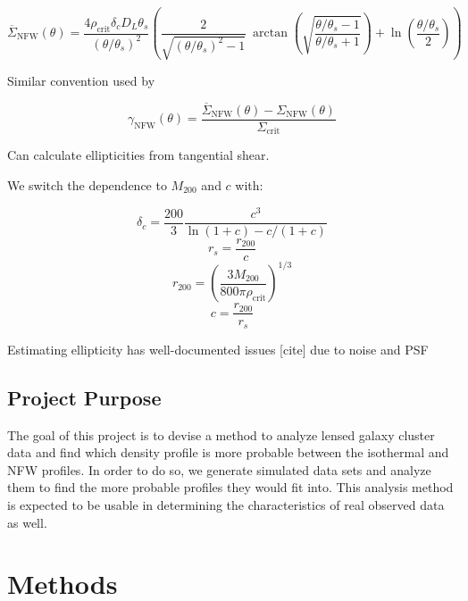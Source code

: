 \documentclass[10pt]{article}
\begin{document}
\begin{equation}
\overline{\Sigma}_\mathrm{NFW}(\theta) = \frac{4 \rho_\mathrm{crit} \delta_c D_L \theta_s}{(\theta/\theta_s)^2} \left(
    \frac{2}{\sqrt{(\theta/\theta_s)^2 - 1}} ~\arctan\left(\sqrt{\frac{\theta/\theta_s - 1}{\theta/\theta_s + 1}} \right) + \ln{\left(\frac{\theta/\theta_s}{2}\right)}
\right)
\end{equation}

Similar convention used by \citet{Bartelmann2001}

\begin{equation}
\gamma_\mathrm{NFW}(\theta) = \frac{\overline{\Sigma}_\mathrm{NFW}(\theta) - \Sigma_\mathrm{NFW}(\theta)}{\Sigma_\mathrm{crit}}
\end{equation}

Can calculate ellipticities from tangential shear.

We switch the dependence to $M_{200}$ and $c$ with:

\begin{equation}
\delta_c = \frac{200}{3} \frac{c^3}{\ln(1 + c) - c/(1 + c)}
\end{equation}
\begin{equation}
r_s = \frac{r_{200}}{c}
\end{equation}
\begin{equation}
r_{200} = \left( \frac{3 M_{200}}{800 \pi \rho_\mathrm{crit}} \right)^{1/3}
\end{equation}
\begin{equation}
c = \frac{r_{200}}{r_s}
\end{equation}

Estimating ellipticity has well-documented issues [cite] due to noise and PSF

\subsection{Project Purpose}
The goal of this project is to devise a method to analyze lensed galaxy cluster data and find which density profile is more probable between the isothermal and NFW profiles.
In order to do so, we generate simulated data sets and analyze them to find the more probable profiles they would fit into.
This analysis method is expected to be usable in determining the characteristics of real observed data as well.

\newpage

\section{Methods}
\end{document}

